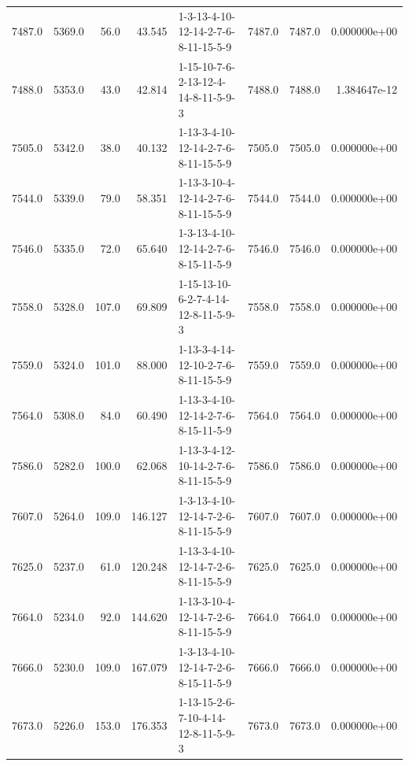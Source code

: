 \begin{tabular}{rrrrlrrr}
 7487.0 &  5369.0 &           56.0 &             43.545 &  1-3-13-4-10-12-14-2-7-6-8-11-15-5-9 &        7487.0 &          7487.0 &  0.000000e+00 \\
 7488.0 &  5353.0 &           43.0 &             42.814 &  1-15-10-7-6-2-13-12-4-14-8-11-5-9-3 &        7488.0 &          7488.0 &  1.384647e-12 \\
 7505.0 &  5342.0 &           38.0 &             40.132 &  1-13-3-4-10-12-14-2-7-6-8-11-15-5-9 &        7505.0 &          7505.0 &  0.000000e+00 \\
 7544.0 &  5339.0 &           79.0 &             58.351 &  1-13-3-10-4-12-14-2-7-6-8-11-15-5-9 &        7544.0 &          7544.0 &  0.000000e+00 \\
 7546.0 &  5335.0 &           72.0 &             65.640 &  1-3-13-4-10-12-14-2-7-6-8-15-11-5-9 &        7546.0 &          7546.0 &  0.000000e+00 \\
 7558.0 &  5328.0 &          107.0 &             69.809 &  1-15-13-10-6-2-7-4-14-12-8-11-5-9-3 &        7558.0 &          7558.0 &  0.000000e+00 \\
 7559.0 &  5324.0 &          101.0 &             88.000 &  1-13-3-4-14-12-10-2-7-6-8-11-15-5-9 &        7559.0 &          7559.0 &  0.000000e+00 \\
 7564.0 &  5308.0 &           84.0 &             60.490 &  1-13-3-4-10-12-14-2-7-6-8-15-11-5-9 &        7564.0 &          7564.0 &  0.000000e+00 \\
 7586.0 &  5282.0 &          100.0 &             62.068 &  1-13-3-4-12-10-14-2-7-6-8-11-15-5-9 &        7586.0 &          7586.0 &  0.000000e+00 \\
 7607.0 &  5264.0 &          109.0 &            146.127 &  1-3-13-4-10-12-14-7-2-6-8-11-15-5-9 &        7607.0 &          7607.0 &  0.000000e+00 \\
 7625.0 &  5237.0 &           61.0 &            120.248 &  1-13-3-4-10-12-14-7-2-6-8-11-15-5-9 &        7625.0 &          7625.0 &  0.000000e+00 \\
 7664.0 &  5234.0 &           92.0 &            144.620 &  1-13-3-10-4-12-14-7-2-6-8-11-15-5-9 &        7664.0 &          7664.0 &  0.000000e+00 \\
 7666.0 &  5230.0 &          109.0 &            167.079 &  1-3-13-4-10-12-14-7-2-6-8-15-11-5-9 &        7666.0 &          7666.0 &  0.000000e+00 \\
 7673.0 &  5226.0 &          153.0 &            176.353 &  1-13-15-2-6-7-10-4-14-12-8-11-5-9-3 &        7673.0 &          7673.0 &  0.000000e+00 \\

\end{tabular}
